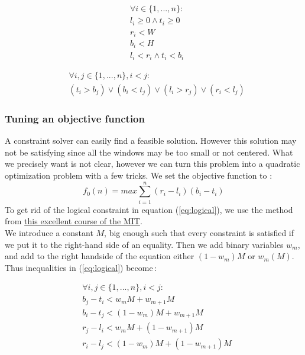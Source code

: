 \documentclass{acmtog}
\begin{document}
\begin{equation}
\begin{split}
&\forall  i \in  \{1, ... ,n\}  :\\
&l_i \geq 0 \wedge t_i \geq 0 \\
&r_i < W \\
&b_i  < H  \\
&l_i < r_i \wedge t_i < b_i
\end{split}
\end{equation}


\begin{equation}
\begin{split}
&\forall i, j \in \{1,..., n\}, i < j : \\
&(t_i > b_j) \lor (b_i < t_j) \lor (l_i > r_j) \lor (r_i < l_j)
\end{split}
\label{eq:logical}
\end{equation}

\subsubsection{Tuning an objective function}
A constraint solver can easily find a feasible solution. However this solution may not be satisfying since all the windows may be too small or not centered. What we precisely want is not clear, however we can turn this problem into a quadratic optimization problem with a few tricks. We set the objective function  to :\\
\begin{equation}
f_0(n) = max \sum_{i=1}^{n}{(r_i-l_i)(b_i-t_i)}
\label{eq:objective}
\end{equation}
To get rid of the logical constraint in equation (\ref{eq:logical}), we use the method from \href{https://ocw.mit.edu/courses/sloan-school-of-management/15-053-optimization-methods-in-management-science-spring-2013/lecture-notes/MIT15_053S13_lec11.pdf}{this excellent course of the MIT}.\\ 
We introduce a constant $M$, big enough such that every constraint is satisfied if we put it to the right-hand side of an equality. Then we add binary variables $w_m$, and add to the right handside of the equation either $(1-w_m) M$ or  $w_m(M)$. Thus inequalities in (\ref{eq:logical}) become\,: 

\begin{equation}
\begin{split}
&\forall i, j \in \{1,..., n\}, i < j : \\
&b_j - t_i < w_mM + w_{m+1}M \\
&b_i - t_j < (1-w_m)M + w_{m+1}M \\
&r_j - l_i < w_mM + (1-w_{m+1})M \\
&r_i - l_j < (1-w_m)M + (1-w_{m+1})M\\
\end{split}
\end{equation}
\end{document}
